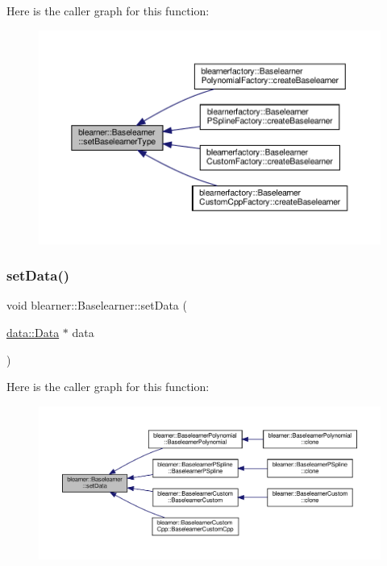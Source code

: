 Here is the caller graph for this function\+:
\nopagebreak
\begin{figure}[H]
\begin{center}
\leavevmode
\includegraphics[width=350pt]{classblearner_1_1_baselearner_a8d78e851bae5f5b93dc46eb13d2d1ee1_icgraph}
\end{center}
\end{figure}
\mbox{\label{classblearner_1_1_baselearner_a29122c6125ef6ec03ad84602b3e2d0d4}} 
\subsubsection{\texorpdfstring{set\+Data()}{setData()}}
{\footnotesize\ttfamily void blearner\+::\+Baselearner\+::set\+Data (\begin{DoxyParamCaption}\item[{\hyperlink{classdata_1_1_data}{data\+::\+Data} $\ast$}]{data }\end{DoxyParamCaption})}

Here is the caller graph for this function\+:
\nopagebreak
\begin{figure}[H]
\begin{center}
\leavevmode
\includegraphics[width=350pt]{classblearner_1_1_baselearner_a29122c6125ef6ec03ad84602b3e2d0d4_icgraph}
\end{center}
\end{figure}
\mbox{\label{classblearner_1_1_baselearner_a6669906a481cbdd516dce8df6f6e5b76}} 
